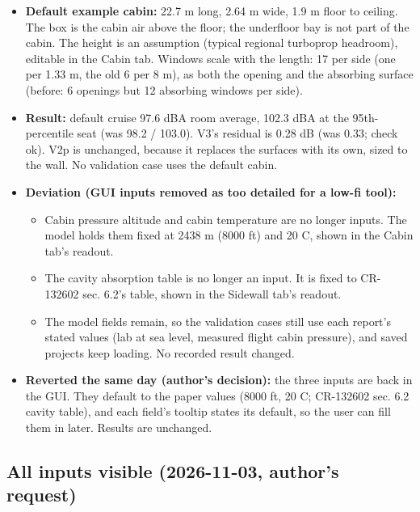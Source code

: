 \documentclass[10pt,a4paper]{article}
\begin{document}
\begin{itemize}
\item \textbf{Default example cabin:} 22.7 m long, 2.64 m wide, 1.9 m floor to ceiling. The box is the cabin air above the floor; the underfloor bay is not part of the cabin. The height is an assumption (typical regional turboprop headroom), editable in the Cabin tab. Windows scale with the length: 17 per side (one per 1.33 m, the old 6 per 8 m), as both the opening and the absorbing surface (before: 6 openings but 12 absorbing windows per side).
\item \textbf{Result:} default cruise 97.6 dBA room average, 102.3 dBA at the 95th-percentile seat (was 98.2 / 103.0). V3's residual is 0.28 dB (was 0.33; check ok). V2p is unchanged, because it replaces the surfaces with its own, sized to the wall. No validation case uses the default cabin.
\item \textbf{Deviation (GUI inputs removed as too detailed for a low-fi tool):}
\begin{itemize}
\item Cabin pressure altitude and cabin temperature are no longer inputs. The model holds them fixed at 2438 m (8000 ft) and 20 C, shown in the Cabin tab's readout.
\item The cavity absorption table is no longer an input. It is fixed to CR-132602 sec. 6.2's table, shown in the Sidewall tab's readout.
\item The model fields remain, so the validation cases still use each report's stated values (lab at sea level, measured flight cabin pressure), and saved projects keep loading. No recorded result changed.
\end{itemize}
\item \textbf{Reverted the same day (author's decision):} the three inputs are back in the GUI. They default to the paper values (8000 ft, 20 C; CR-132602 sec. 6.2 cavity table), and each field's tooltip states its default, so the user can fill them in later. Results are unchanged.
\end{itemize}

\subsection*{All inputs visible (2026-11-03, author's request)}
\end{document}
